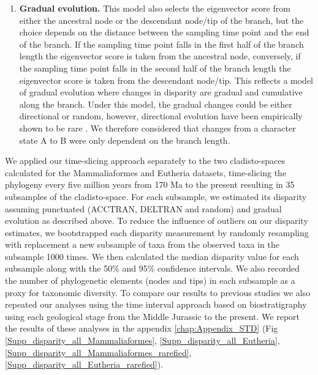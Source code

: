 \begin{enumerate}
    \item{\textbf{Gradual evolution.}}
    This model also selects the eigenvector score from either the ancestral node or the descendant node/tip of the branch, but the choice depends on the distance between the sampling time point and the end of the branch.
    If the sampling time point falls in the first half of the branch length the eigenvector score is taken from the ancestral node, conversely, if the sampling time point falls in the second half of the branch length the eigenvector score is taken from the descendant node/tip.
    This reflects a model of gradual evolution where changes in disparity are gradual and cumulative along the branch.
    Under this model, the gradual changes could be either directional or random, however, directional evolution have been empirically shown to be rare \citep[only 5\% of the time][]{Hunt20112007}.
    We therefore considered that changes from a character state A to B were only dependent on the branch length.
\end{enumerate}
We applied our time-slicing approach separately to the two cladisto-spaces calculated for the Mammaliaformes and Eutheria datasets, time-slicing the phylogeny every five million years from 170 Ma to the present resulting in 35 subsamples of the cladisto-space.
For each subsample, we estimated its disparity assuming punctuated (ACCTRAN, DELTRAN and random) and gradual evolution as described above.
To reduce the influence of outliers on our disparity estimates, we bootstrapped each disparity measurement by randomly resampling with replacement a new subsample of taxa from the observed taxa in the subsample 1000 times.
We then calculated the median disparity value for each subsample along with the 50\% and 95\% confidence intervals.
We also recorded the number of phylogenetic elements (nodes and tips) in each subsample as a proxy for taxonomic diversity.
To compare our results to previous studies we also repeated our analyses using the time interval approach based on biostratigraphy \citep[e.g.][]{cisneros2010,prentice2011,Hughes20082013,bentonmodels2014} using each geological stage from the Middle Jurassic to the present.
We report the results of these analyses in the appendix \ref{chap:Appendix_STD} (Fig \ref{Supp_disparity_all_Mammaliaformes}, \ref{Supp_disparity_all_Eutheria}, \ref{Supp_disparity_all_Mammaliaformes_rarefied}, \ref{Supp_disparity_all_Eutheria_rarefied}).

